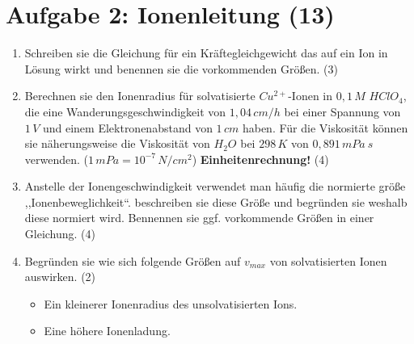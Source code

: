\section*{Aufgabe 2: Ionenleitung (13)}
\begin{enumerate}

\item Schreiben sie die Gleichung für ein Kräftegleichgewicht das auf ein Ion in Lösung
wirkt und benennen sie die vorkommenden Größen. (3)

\item Berechnen sie den Ionenradius für solvatisierte \(Cu^{2+}\)-Ionen in \(0,1\, M\)
\(HClO_4\), die eine Wanderungsgeschwindigkeit von \(1,04 \, cm/h\) bei einer Spannung
von \(1\, V\) und einem Elektronenabstand von \(1\, cm \) haben. Für die Viskosität
können sie näherungsweise die Viskosität von \(H_2O\) bei \(298\, K\) von \(0,891\, mPa\ s\) 
verwenden. (\(1\,mPa = 10^{-7}\, N/cm^2\)) \textbf{Einheitenrechnung!} (4)

\item Anstelle der Ionengeschwindigkeit verwendet man häufig die normierte größe 
,,Ionenbeweglichkeit``. beschreiben sie diese Größe und begründen sie weshalb diese
normiert wird. Bennennen sie ggf. vorkommende Größen in einer Gleichung. (4)

\item Begründen sie wie sich folgende Größen auf \(v_{max}\) von solvatisierten Ionen
auswirken. (2)
\begin{itemize}
\item Ein kleinerer Ionenradius des unsolvatisierten Ions.
\item Eine höhere Ionenladung.
\end{itemize}
\end{enumerate}